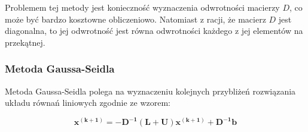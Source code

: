 \documentclass{article}
\begin{document}
Problemem tej metody jest konieczność wyznaczenia odwrotności macierzy $D$,
co może być bardzo kosztowne obliczeniowo. Natomiast z racji, że
macierz $D$ jest diagonalna, to jej odwrotność jest równa odwrotności
każdego z jej elementów na przekątnej.

\subsubsection{Metoda Gaussa-Seidla}

Metoda Gaussa-Seidla polega na wyznaczeniu kolejnych przybliżeń
rozwiązania układu równań liniowych zgodnie ze wzorem:

\begin{equation}
    \boldsymbol{x^{(k+1)} = -D^{-1}(L + U)x^{(k+1)} + D^{-1}b}
\end{equation}
\end{document}
